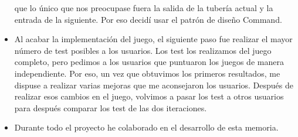 \begin{itemize}
  que lo único que nos preocupase fuera la salida de la tubería actual y
  la entrada de la siguiente. Por eso decidí usar el patrón de diseño
  Command.
\item
  Al acabar la implementación del juego, el siguiente paso fue realizar
  el mayor número de test posibles a los usuarios. Los test los
  realizamos del juego completo, pero pedimos a los usuarios que
  puntuaron los juegos de manera independiente. Por eso, un vez que
  obtuvimos los primeros resultados, me dispuse a realizar varias
  mejoras que me aconsejaron los usuarios. Después de realizar esos
  cambios en el juego, volvimos a pasar los test a otros usuarios para
  después comparar los test de las dos iteraciones.
\item
  Durante todo el proyecto he colaborado en el desarrollo de esta
  memoria.
\end{itemize}
